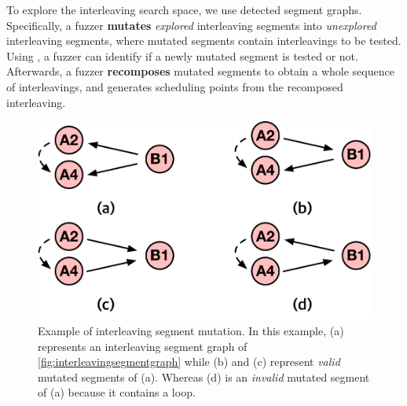 To explore the interleaving search space, we use detected segment 
graphs.
%
Specifically, a fuzzer \textbf{mutates} \textit{explored} interleaving
segments into \textit{unexplored} interleaving segments, where mutated
segments contain interleavings to be tested.  Using \intcov, a fuzzer
can identify if a newly mutated segment is tested or not.
%
\dr{}
Afterwards, a fuzzer \textbf{recomposes} mutated segments
to obtain a whole sequence of interleavings, and generates 
scheduling points from the recomposed interleaving.
%

%
%


\begin{figure}[t]
  \centering
  \includegraphics[width=0.7\linewidth]{fig/interleavingmutation.pdf}
  \caption{Example of interleaving segment mutation. In this example,
    (a) represents an interleaving segment graph of
    \autoref{fig:interleavingsegmentgraph} while (b) and (c) represent
    \textit{valid} mutated segments of (a). Whereas (d) is an
    \textit{invalid} mutated segment of (a) because it contains a
    loop.}
  \label{fig:interleavingmutation}
\end{figure}

